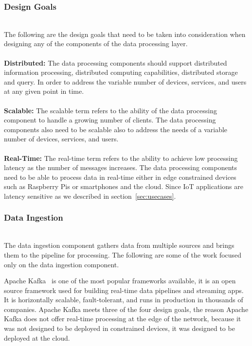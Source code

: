 \subsubsection{Design Goals}
\hfill\\
The following are the design goals that need to be taken into consideration when designing any of the components of the data processing layer.
\\\\
\textbf{Distributed:} The data processing components should support distributed information processing, distributed computing capabilities, distributed storage and query. In order to address the variable number of devices, services, and users at any given point in time.
\\\\
\textbf{Scalable:} The scalable term refers to the ability of the data processing component to handle a growing number of
clients. The data processing components also need to be scalable also to address the needs of a variable number of devices, services, and users. 
\\\\
\textbf{Real-Time:} The real-time term refers to the ability to achieve low processing latency as the number of messages increases. The data processing components need to be able to process data in real-time either in edge constrained devices such as Raspberry Pis or smartphones and the cloud. Since IoT applications are latency sensitive as we described in section~\ref{sec:usecases}. 

\subsubsection{Data Ingestion}
\hfill\\
The data ingestion component gathers data from multiple sources and brings them to the pipeline for processing. The following are some of the work focused only on the data ingestion component.

Apache Kafka~\cite{kafka} is one of the most popular frameworks available, it is an open source framework used for building real-time data pipelines and streaming apps. It is horizontally scalable, fault-tolerant, and runs in production in thousands of companies. Apache Kafka meets three of the four design goals, the reason Apache Kafka does not offer real-time processing at the edge of the network, because it was not designed to be deployed in constrained devices, it was designed to be deployed at the cloud. 

